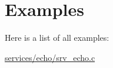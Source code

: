 \section{Examples}
Here is a list of all examples:\begin{DoxyCompactItemize}
\item 
\hyperlink{services_2echo_2srv__echo_8c-example}{services/echo/srv\_\-echo.c}
\end{DoxyCompactItemize}
